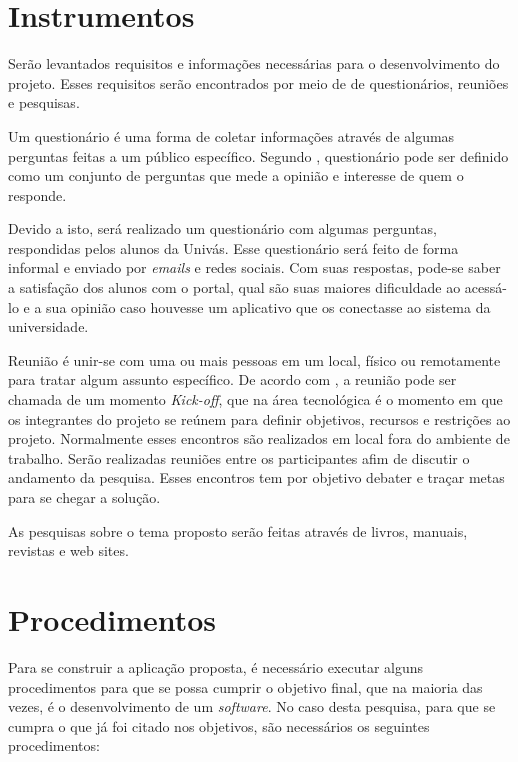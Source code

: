 \section{Instrumentos}

	\par Serão levantados requisitos e informações necessárias para o
desenvolvimento do projeto. Esses requisitos serão encontrados por meio de
de questionários, reuniões e pesquisas.

	\par Um questionário é uma forma de coletar informações através de algumas
perguntas feitas a um público específico. Segundo ,
questionário pode ser definido como um conjunto de perguntas que mede a opinião
e interesse de quem o responde.

	\par Devido a isto, será realizado um questionário com algumas perguntas,
respondidas pelos alunos da Univás. Esse questionário será feito de forma
informal e enviado por \textit{emails} e redes sociais. Com suas respostas,
pode-se saber a satisfação dos alunos com o portal, qual são suas maiores
dificuldade ao acessá-lo e a sua opinião caso houvesse um aplicativo que os
conectasse ao sistema da universidade.

	\par Reunião é unir-se com uma ou mais pessoas em um local, físico ou
remotamente para tratar algum assunto específico. De acordo com
, a reunião pode ser chamada de um momento
\textit{Kick-off}, que na área tecnológica é o momento em que os integrantes do
projeto se reúnem para definir objetivos, recursos e restrições ao projeto.
Normalmente esses encontros são realizados em local fora do ambiente de
trabalho. Serão realizadas reuniões entre os participantes afim de discutir o
andamento da pesquisa. Esses encontros tem por objetivo debater e traçar metas
para se chegar a solução.

	\par As pesquisas sobre o tema proposto serão feitas através de livros,
manuais, revistas e web sites.
	
\section{Procedimentos}

	\par Para se construir a aplicação proposta, é necessário executar alguns 
procedimentos para que se possa cumprir o objetivo final, que na maioria das
vezes, é o desenvolvimento de um \textit{software}. No caso desta pesquisa,
para que se cumpra o que já foi citado nos objetivos, são necessários os
seguintes procedimentos:


